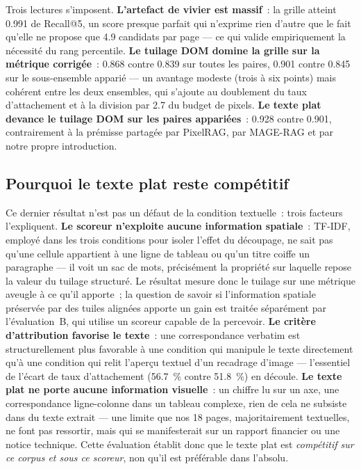 Trois lectures s'imposent. \textbf{L'artefact de vivier est massif}~: la
grille atteint \num{0.991} de Recall@5, un score presque parfait qui
n'exprime rien d'autre que le fait qu'elle ne propose que \num{4.9}
candidats par page --- ce qui valide empiriquement la nécessité du rang
percentile. \textbf{Le tuilage DOM domine la grille sur la métrique
corrigée}~: \num{0.868} contre \num{0.839} sur toutes les paires,
\num{0.901} contre \num{0.845} sur le sous-ensemble apparié --- un avantage
modeste (trois à six points) mais cohérent entre les deux ensembles, qui
s'ajoute au doublement du taux d'attachement et à la division par \num{2.7}
du budget de pixels. \textbf{Le texte plat devance le tuilage DOM sur les
paires appariées}~: \num{0.928} contre \num{0.901}, contrairement à la
prémisse partagée par PixelRAG, par MAGE-RAG et par notre propre
introduction.

\subsection{Pourquoi le texte plat reste compétitif}

Ce dernier résultat n'est pas un défaut de la condition textuelle~: trois
facteurs l'expliquent. \textbf{Le scoreur n'exploite aucune information
spatiale}~: TF-IDF, employé dans les trois conditions pour isoler l'effet du
découpage, ne sait pas qu'une cellule appartient à une ligne de tableau ou
qu'un titre coiffe un paragraphe --- il voit un sac de mots, précisément la
propriété sur laquelle repose la valeur du tuilage structuré. Le résultat
mesure donc le tuilage sur une métrique aveugle à ce qu'il apporte~; la
question de savoir si l'information spatiale préservée par des tuiles
alignées apporte un gain est traitée séparément par l'évaluation~B, qui
utilise un scoreur capable de la percevoir. \textbf{Le critère d'attribution
favorise le texte}~: une correspondance verbatim est structurellement plus
favorable à une condition qui manipule le texte directement qu'à une
condition qui relit l'aperçu textuel d'un recadrage d'image --- l'essentiel
de l'écart de taux d'attachement (\SI{56.7}{\percent} contre
\SI{51.8}{\percent}) en découle. \textbf{Le texte plat ne porte aucune
information visuelle}~: un chiffre lu sur un axe, une correspondance
ligne-colonne dans un tableau complexe, rien de cela ne subsiste dans du
texte extrait --- une limite que nos \num{18} pages, majoritairement
textuelles, ne font pas ressortir, mais qui se manifesterait sur un rapport
financier ou une notice technique. Cette évaluation établit donc que le
texte plat est \emph{compétitif sur ce corpus et sous ce scoreur}, non qu'il
est préférable dans l'absolu.

